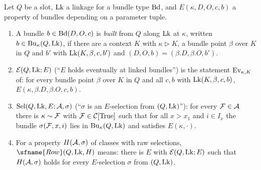 \begin{definition}[Rows]\label{pf:stageU:rows}
Let $Q$ be a slot, $\mathrm{Lk}$ a linkage for a bundle type $\mathrm{Bd}$, and $E(\kappa,D,O,c,b)$ a property of bundles
depending on a parameter tuple.
\begin{enumerate}[label=(\alph*)]
\item A bundle $b\in\mathrm{Bd}(D,O,c)$ is \emph{built} from $Q$ along $\mathrm{Lk}$ at $\kappa$, written
$b\in\mathrm{Bu}_\kappa(Q,\mathrm{Lk})$, if there are a context $K$ with $\kappa\triangleright K$, a bundle point $\beta$ over $K$ in
$Q$ and $b'$ with $\mathrm{Lk}(K,\beta,c,b')$ and $(D,O,b)=(\beta.D,\beta.O,b')$.
\item $\mathcal{E}(Q,\mathrm{Lk};E)$ (``$E$ holds eventually at linked bundles'') is the statement
$\mathrm{Ev}_{\kappa,K}$ of: for every bundle point $\beta$ over $K$ in $Q$ and all $c,b$ with $\mathrm{Lk}(K,\beta,c,b)$,
$E(\kappa,\beta.D,\beta.O,c,b)$.
\item $\mathrm{Sel}(Q,\mathrm{Lk},E;\mathcal{A},\sigma)$ (``$\sigma$ is an $E$-selection from $(Q,\mathrm{Lk})$''): for every
$\mathcal{F}\in\mathcal{A}$ there is $\kappa\sim\mathcal{F}$ with $\mathcal{F}\in\mathcal{C}[\mathrm{True}]$ such that for all $x>x_1$ and
$i\in I_x$ the bundle $\sigma(\mathcal{F},x,i)$ lies in $\mathrm{Bu}_\kappa(Q,\mathrm{Lk})$ and satisfies $E(\kappa,\cdot)$.
\item For a property $H(\mathcal{A},\sigma)$ of classes with raw selections, $\sfname{Row}(Q,\stageULk,H)$ means: there is $E$
with $\mathcal{E}(Q,\mathrm{Lk};E)$ such that $H(\mathcal{A},\sigma)$ holds for every $E$-selection $\sigma$ from $(Q,\mathrm{Lk})$.
\end{enumerate}
\end{definition}

